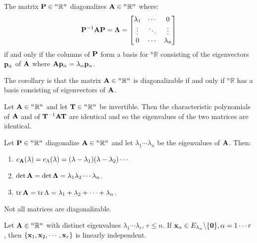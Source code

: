 \documentclass{article}
\begin{document}
    \begin{theorem}
        The matrix $\mathbf{P} \in {^n}\mathbb{R}^n$ diagonalizes $\mathbf{A} \in {^n}\mathbb{R}^n$ where:
        \begin{equation}
            \mathbf{P}^{-1}\mathbf{A}\mathbf{P} = \mathbf{\Lambda} = \begin{bmatrix}
                \lambda_1 & \cdots & 0 \\ 
                \vdots & \ddots & \vdots \\ 
                0 & \cdots & \lambda_n
            \end{bmatrix}
        \end{equation}
        if and only if the columns of $\mathbf{P}$ form a basis for ${^n}\mathbb{R}$ consisting of the eigenvectors $\mathbf{p}_\alpha$ of $\mathbf{A}$ where $\mathbf{A}\mathbf{p}_\alpha = \lambda_\alpha \mathbf{p}_\alpha$.
    \end{theorem}
    The corollary is that the matrix $\mathbf{A}\in{^n}\mathbb{R}^n$ is diagonalizable if and only if ${^n}\mathbb{R}$ has a basis consisting of eigenvectors of $\mathbf{A}$.
    \begin{proposition}
        Let $\mathbf{A} \in {^n}\mathbb{R}^n$ and let $\mathbf{T} \in {^n}\mathbb{R}^n$ be invertible. Then the characteristic polynomials of $\mathbf{A}$ and of $\mathbf{T}^{-1}\mathbf{A}\mathbf{T}$ are identical and so the eigenvalues of the two matrices are identical.
    \end{proposition}
    \begin{theorem}
        Let $\mathbf{P} \in {^n}\mathbb{R}^n$ diagonalize $\mathbf{A} \in {^n}\mathbb{R}^n$ and let $\lambda_1 \cdots \lambda_n$ be the eigenvalues of $\mathbf{A}$. Then:
        \begin{enumerate}[label=(\alph*)]
            \item $c_{\mathbf{A}}(\lambda) = c_\Lambda(\lambda) = (\lambda-\lambda_1)(\lambda-\lambda_2)\cdots$
            \item $\det \mathbf{A} = \det \mathbf{\Lambda} = \lambda_1\lambda_2\cdots\lambda_n$.
            \item $\tr\mathbf{A} = \tr \Lambda = \lambda_1+\lambda_2+\cdots +\lambda_n$.
        \end{enumerate}
    \end{theorem}
    Not all matrices are diagonalizable.
    \begin{theorem}
        Let $\mathbf{A}\in{^n}\mathbb{R}^n$ with distinct eigenvalues $\lambda_1\cdots\lambda_r$, $r\le n$. If $\mathbf{x}_\alpha \in E_{\lambda_\alpha} \backslash \{\mathbf{0}\},\alpha=1\cdots r$, then $\{\mathbf{x}_1,\mathbf{x}_2,\cdots,\mathbf{x}_r\}$ is linearly independent.
    \end{theorem}
\end{document}
